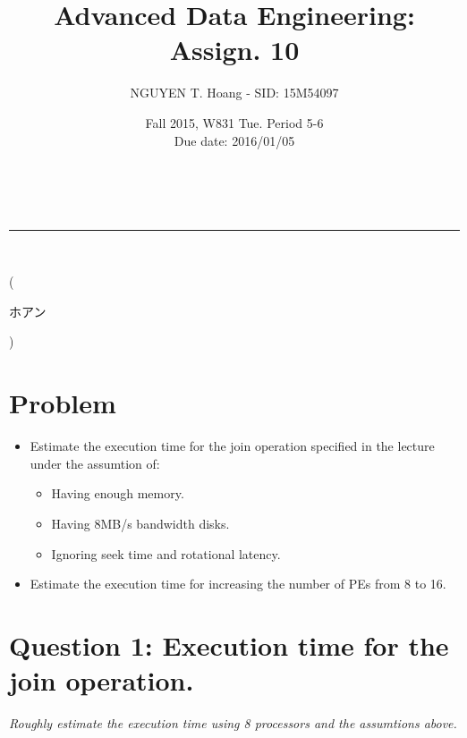 \documentclass[a4paper,12pt]{article}
\makeatletter
\newcommand{\linia}{\rule{\linewidth}{0.5pt}}
\renewcommand{\maketitle} {
\begin{center}
\vspace{2ex}
{\LARGE \textsc{\@title}}
\vspace{1ex}
\\
\linia\\
\@author \hfill \@date
\vspace{4ex}
\end{center}
}
\makeatother
\begin{document}
\title{Advanced Data Engineering: Assign. 10}

\author{NGUYEN T. Hoang - SID: 15M54097}

\date{Fall 2015, W831 Tue. Period 5-6 \\ \hfill Due date: 2016/01/05}

\maketitle
\vspace{-4.5em}
\hspace{5.3em} (\begin{CJK}{UTF8}{min}ホアン\end{CJK})
\vspace{4em}
\section*{Problem}
\begin{itemize}
	\item Estimate the execution time for the join operation specified in the lecture under the assumtion of:
\begin{itemize}
	\setlength{\parskip}{0cm}
	\setlength{\itemsep}{0cm}
	\item Having enough memory.
	\item Having 8MB/s bandwidth disks.
	\item Ignoring seek time and rotational latency. 
\end{itemize}
    \item Estimate the execution time for increasing the number of PEs from 8 to 16.
\end{itemize}
\vspace{4em}
\section*{Question 1: Execution time for the join operation.}
\setcounter{section}{1}

\textit{Roughly estimate the execution time using 8 processors and the assumtions above.} 
\end{document}
